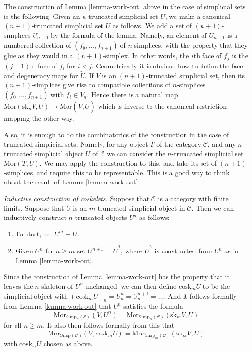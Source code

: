 \begin{remark}
\label{remark-cosk-simplicial-sets}
The construction of Lemma \ref{lemma-work-out}
above in the case of simplicial
sets is the following. Given an $n$-truncated simplicial
set $U$, we make a canonical $(n + 1)$-truncated simplicial
set $\tilde U$ as follows. We add a set of $(n + 1)$-simplices
$U_{n + 1}$ by the formula of the lemma. Namely,
an element of $U_{n + 1}$ is a numbered collection of
$(f_0, \ldots, f_{n + 1})$ of $n$-simplices,
with the property that they glue
as they would in a $(n + 1)$-simplex. In other words,
the $i$th face of $f_j$ is the $(j-1)$st face of $f_i$
for $i < j$. Geometrically it is obvious how to define the
face and degeneracy maps for $\tilde U$.
If $V$ is an $(n + 1)$-truncated simplicial set,
then its $(n + 1)$-simplices give rise to compatible collections
of $n$-simplices $(f_0, \ldots, f_{n + 1})$ with $f_i \in V_n$.
Hence there is a natural map
$\text{Mor}(\text{sk}_nV, U) \to \text{Mor}(V, \tilde U)$
which is inverse to the canonical restriction mapping
the other way.

\medskip\noindent
Also, it is enough to do the combinatorics of the
construction in the case of truncated simplicial sets.
Namely, for any object $T$ of the category $\mathcal{C}$,
and any $n$-truncated simplicial object $U$ of $\mathcal{C}$
we can consider the $n$-truncated simplicial set
$\text{Mor}(T, U)$. We may apply the construction to this,
and take its set of $(n + 1)$-simplices, and require this to be
representable. This is a good way to think about
the result of Lemma \ref{lemma-work-out}.
\end{remark}

\begin{remark}
\label{remark-inductive-coskelet}
{\it Inductive construction of coskelets.}
Suppose that $\mathcal{C}$ is a category with
finite limits. Suppose that $U$ is an $m$-truncated
simplicial object in $\mathcal{C}$. Then we can
inductively construct $n$-truncated objects $U^n$ as
follows:
\begin{enumerate}
\item To start, set $U^m = U$.
\item Given $U^n$ for $n \geq m$ set $U^{n + 1} = \tilde U^n$,
where $\tilde U^n$ is constructed from $U^n$ as in Lemma
\ref{lemma-work-out}.
\end{enumerate}
Since the construction of Lemma \ref{lemma-work-out} has
the property that it leaves the $n$-skeleton of $U^n$
unchanged, we can then define $\text{cosk}_m U$ to be
the simplicial object with
$(\text{cosk}_m U)_n = U^n_n = U^{n + 1}_n = \ldots$.
And it follows formally from Lemma \ref{lemma-work-out}
that $U^n$ satisfies the formula
$$
\text{Mor}_{\text{Simp}_n(\mathcal{C})}(V, U^n)
=
\text{Mor}_{\text{Simp}_m(\mathcal{C})}(\text{sk}_mV, U)
$$
for all $n \geq m$. It also then follows formally
from this that
$$
\text{Mor}_{\text{Simp}(\mathcal{C})}(V, \text{cosk}_mU)
=
\text{Mor}_{\text{Simp}_m(\mathcal{C})}(\text{sk}_mV, U)
$$
with $\text{cosk}_mU$ chosen as above.
\end{remark}

